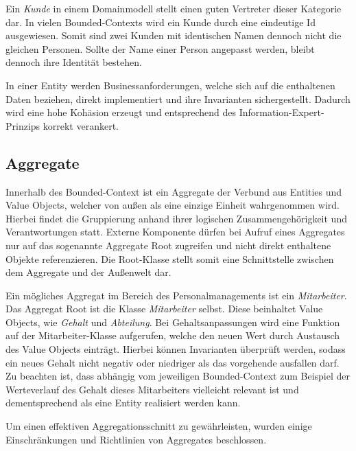 Ein \emph{Kunde} in einem Domainmodell stellt einen guten Vertreter dieser Kategorie dar. In vielen Bounded-Contexts wird ein Kunde durch eine eindeutige Id ausgewiesen. Somit sind zwei Kunden mit identischen Namen dennoch nicht die gleichen Personen. Sollte der Name einer Person angepasst werden, bleibt dennoch ihre Identität bestehen.

In einer Entity werden Businessanforderungen, welche sich auf die enthaltenen Daten beziehen, direkt implementiert und ihre \Gls{Invariante}n sichergestellt. Dadurch wird eine hohe Kohäsion erzeugt und entsprechend des \Gls{Information-Expert-Prinzip}s korrekt verankert.


\subsection{Aggregate}

Innerhalb des Bounded-Context ist ein Aggregate der Verbund aus Entities und Value Objects, welcher von außen als eine einzige Einheit wahrgenommen wird. Hierbei findet die Gruppierung anhand ihrer logischen Zusammengehörigkeit und Verantwortungen statt. Externe Komponente dürfen bei Aufruf eines Aggregates nur auf das sogenannte Aggregate Root zugreifen und nicht direkt enthaltene Objekte referenzieren. Die Root-Klasse stellt somit eine Schnittstelle zwischen dem Aggregate und der Außenwelt dar. 

Ein mögliches Aggregat im Bereich des Personalmanagements ist ein \emph{Mitarbeiter}. Das Aggregat Root ist die Klasse \emph{Mitarbeiter} selbst. Diese beinhaltet Value Objects, wie \emph{Gehalt} und \emph{Abteilung}. Bei Gehaltsanpassungen wird eine Funktion auf der Mitarbeiter-Klasse aufgerufen, welche den neuen Wert durch Austausch des Value Objects einträgt. Hierbei können Invarianten überprüft werden, sodass ein neues Gehalt nicht negativ oder niedriger als das vorgehende ausfallen darf. Zu beachten ist, dass abhängig vom jeweiligen Bounded-Context zum Beispiel der Werteverlauf des Gehalt dieses Mitarbeiters vielleicht relevant ist und dementsprechend als eine Entity realisiert werden kann. 

Um einen effektiven Aggregationsschnitt zu gewährleisten, wurden einige Einschränkungen und Richtlinien von Aggregates beschlossen. 

